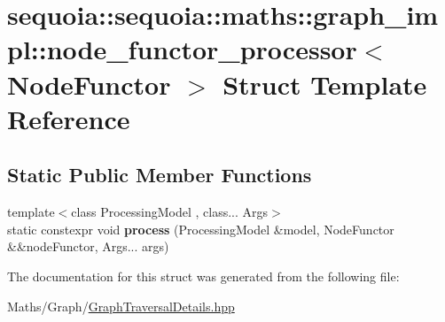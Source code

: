 \hypertarget{structsequoia_1_1sequoia_1_1maths_1_1graph__impl_1_1node__functor__processor}{}\section{sequoia\+::sequoia\+::maths\+::graph\+\_\+impl\+::node\+\_\+functor\+\_\+processor$<$ Node\+Functor $>$ Struct Template Reference}
\label{structsequoia_1_1sequoia_1_1maths_1_1graph__impl_1_1node__functor__processor}
\subsection*{Static Public Member Functions}
\begin{DoxyCompactItemize}
\item 
\mbox{\label{structsequoia_1_1sequoia_1_1maths_1_1graph__impl_1_1node__functor__processor_a4b0f0db155d5e373334689de4264ec1d}} 
{\footnotesize template$<$class Processing\+Model , class... Args$>$ }\\static constexpr void {\bfseries process} (Processing\+Model \&model, Node\+Functor \&\&node\+Functor, Args... args)
\end{DoxyCompactItemize}


The documentation for this struct was generated from the following file\+:\begin{DoxyCompactItemize}
\item 
Maths/\+Graph/\mbox{\hyperlink{_graph_traversal_details_8hpp}{Graph\+Traversal\+Details.\+hpp}}\end{DoxyCompactItemize}
